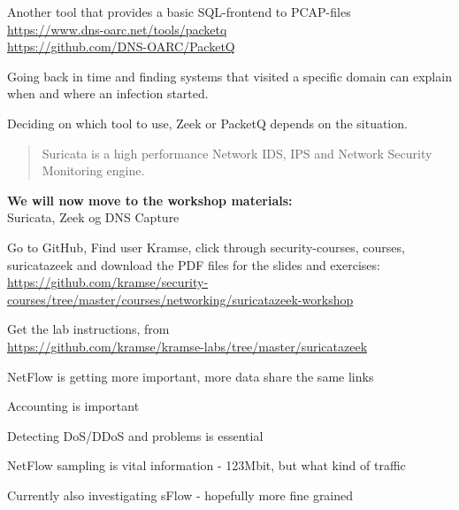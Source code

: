 \documentclass[Screen16to9,17pt]{foils}
\begin{document}
Another tool that provides a basic SQL-frontend to PCAP-files\\
\url{https://www.dns-oarc.net/tools/packetq}\\
\url{https://github.com/DNS-OARC/PacketQ}

Going back in time and finding systems that visited a specific domain can explain when and where an infection started.

Deciding on which tool to use, Zeek or PacketQ depends on the situation.





\begin{quote}
Suricata is a high performance Network IDS, IPS and Network Security Monitoring engine.
\end{quote}


{\bf We will now move to the workshop materials:}\\
Suricata, Zeek og DNS Capture\\
{\small{}}


\begin{list2}
\item Go to GitHub, Find user Kramse, click through security-courses, courses, suricatazeek and download the PDF files for the slides and exercises:\\  {\footnotesize \url{https://github.com/kramse/security-courses/tree/master/courses/networking/suricatazeek-workshop}}

\item Get the lab instructions, from\\ {\footnotesize\url{https://github.com/kramse/kramse-labs/tree/master/suricatazeek}}
\end{list2}



\begin{slidelist}
\item NetFlow is getting more important, more data share the same links
\item Accounting is important
\item Detecting DoS/DDoS and problems is essential
\item NetFlow sampling is vital information - 123Mbit, but what kind of traffic
\item Currently also investigating sFlow - hopefully more fine grained
\end{slidelist}
\end{document}
